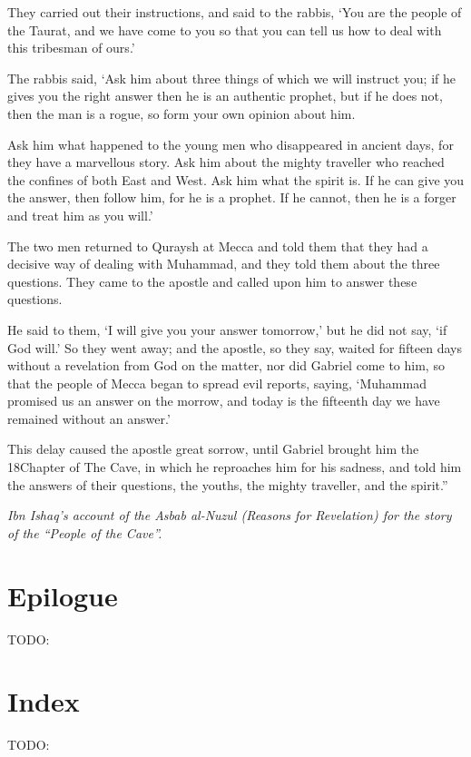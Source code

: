 \documentclass[12pt]{memoir}
\def\–{-\hskip0pt}
\newcommand{\QRef}[1]{{\color{darkblue}#1}}
\begin{document}
They carried out their instructions, and said to the rabbis,
‘You are the people of the Taurat, and we have come to you
so that you can tell us how to deal with this tribesman of ours.’

The rabbis said, ‘Ask him about three things of which we will instruct you;
if he gives you the right answer then he is an authentic prophet,
but if he does not, then the man is a rogue,
so form your own opinion about him.

Ask him what happened to the young men who disappeared in ancient days,
for they have a marvellous story.
Ask him about the mighty traveller
who reached the confines of both East and West.
Ask him what the spirit is.
If he can give you the answer, then follow him, for he is a prophet.
If he cannot, then he is a forger and treat him as you will.’

The two men returned to Quraysh at Mecca and told them
that they had a decisive way of dealing with Muhammad,
and they told them about the three questions.
They came to the apostle and called upon him to answer these questions.

He said to them, ‘I will give you your answer tomorrow,’
but he did not say, ‘if God will.’
So they went away; and the apostle, so they say,
waited for fifteen days without a revelation from God on the matter,
nor did Gabriel come to him, so that the people of Mecca
began to spread evil reports, saying,
‘Muhammad promised us an answer on the morrow,
and today is the fifteenth day we have remained without an answer.’

This delay caused the apostle great sorrow,
until Gabriel brought him the \QRef{18}{Chapter of The Cave},
in which he reproaches him for his sadness,
and told him the answers of their questions, the youths,
the mighty traveller, and the spirit.”

\emph{Ibn Ishaq's account of the Asbab al\–Nuzul
(Reasons for Revelation) for the story of the “People of the Cave”.}


\backmatter

\chapter{Epilogue}
TODO:

\chapter{Index}
TODO:
\end{document}
